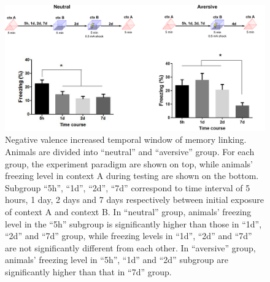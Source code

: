 \documentclass[master.tex]{subfiles}
\begin{document}
\begin{figure}
  \centering \includegraphics[scale = .095]{Figures/val_retro_prelim.pdf}
  \caption{\footnotesize Negative valence increased temporal window of memory
    linking. Animals are divided into ``neutral'' and ``aversive'' group. For
    each group, the experiment paradigm are shown on top, while animals'
    freezing level in context A during testing are shown on the bottom. Subgroup
    ``5h'', ``1d'', ``2d'', ``7d'' correspond to time interval of 5 hours, 1
    day, 2 days and 7 days respectively between initial exposure of context A
    and context B. In ``neutral'' group, animals' freezing level in the ``5h''
    subgroup is significantly higher than those in ``1d'', ``2d'' and ``7d''
    group, while freezing levels in ``1d'', ``2d'' and ``7d'' are not
    significantly different from each other. In ``aversive'' group, animals'
    freezing level in ``5h'', ``1d'' and ``2d'' subgroup are significantly
    higher than that in ``7d'' group.}
  \label{fig:prelim_val}
\end{figure}

\end{document}
